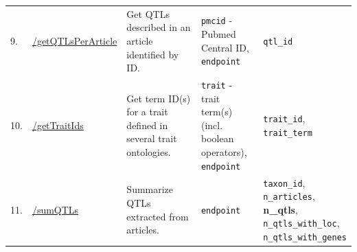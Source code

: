 \documentclass[applsci,article,accept,moreauthors,pdftex]{Definitions/mdpi}
\begin{document}
{\begin{table}[H]
{\begin{tabular}{m{1.2cm}<{\raggedright}m{3cm}<{\raggedright}m{3.5cm}<{\raggedright}m{4.5cm}<{\raggedright}m{3cm}<{\raggedright}}
9. & \href{http://localhost:8088/api-local/\#/Get\%20QTLs\%20in\%20an\%20article/get_getQTLsPerArticle}{/getQTLsPerArticle}
& Get QTLs described in an article identified by ID.
& \makecell[l]{\texttt{pmcid} - Pubmed Central ID,\\ \texttt{endpoint}}
& \texttt{qtl\_id}\\

10. & \href{http://localhost:8088/api-local/\#/Get\%20ontology\%20term\%20ID(s)\%20for\%20a\%20trait/get_getTraitIds}{/getTraitIds}
& Get term ID(s) for a trait defined in several trait ontologies.
& \makecell[l]{\texttt{trait} - trait term(s)\\ (incl. boolean operators),\\ \texttt{endpoint}}
& \makecell[l]{\texttt{trait\_id},\\ \texttt{trait\_term}}\\

11. & \href{http://localhost:8088/api-local/\#/Summarize\%20QTLs/get_sumQTLs}{/sumQTLs}
& Summarize QTLs extracted from articles.
& \texttt{endpoint}
& \makecell[l]{\texttt{taxon\_id},\\ \texttt{n\_articles},\\ \textbf{n\_qtls},\\ \texttt{n\_qtls\_with\_loc},\\ \texttt{n\_qtls\_with\_genes}}\\
\bottomrule
\end{tabular}}
\end{table}









}
\end{document}
